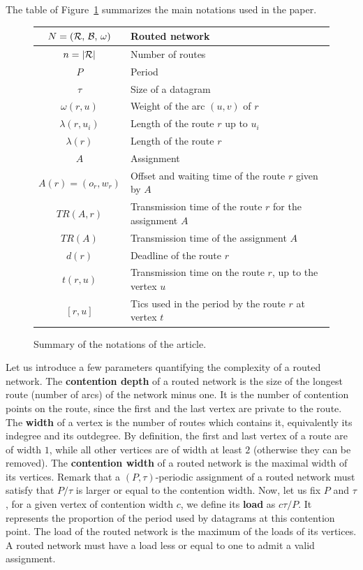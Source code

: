 \documentclass[a4paper,10pt]{journal}
\begin{document}
      The table of Figure~\ref{tab:summary} summarizes the main notations used in the paper.
    \begin{figure}
      \begin{center}
    \begin{tabularx}{\textwidth}{|c|X|}
    \hline
     $N = (\cal{R},\,\cal{B},\,\omega)$ & Routed network \\
     \hline
     $n = |\cal{R}|$ & Number of routes\\
     \hline
     $P$ & Period\\
     \hline
     $\tau$ & Size of a datagram\\
     \hline
     $\omega(r,u)$ & Weight of the arc $(u,v)$ of $r$ \\
     \hline
     $\lambda(r,u_i)$ & Length of the route $r$ up to $u_i$\\
     \hline
     $\lambda(r)$ & Length of the route $r$\\
     \hline 
     $A$ & Assignment\\
     \hline 
     $A(r) = (o_r,w_r)$ & Offset and waiting time of the route $r$ given by $A$ \\
     \hline 
     $TR(A,r)$& Transmission time of the route $r$ for the assignment $A$\\
     \hline 
     $TR(A)$& Transmission time of the assignment $A$\\
     \hline
     $d(r)$ & Deadline of the route $r$\\
     \hline
	 $t(r,u)$ & Transmission time on the route $r$, up to the vertex $u$\\
     \hline
     $ [r,u]$ & Tics used in the period by the route $r$ at vertex $t$\\
     \hline
      \end{tabularx}
      \end{center}
      \caption{Summary of the notations of the article.}\label{tab:summary}
    \end{figure}
  	
  	Let us introduce a few parameters quantifying the complexity of a routed network.
	The \textbf{contention depth} of a routed network is the size of the longest route (number of arcs) of the network minus one. It is the number of contention points on the route, since the first and the last vertex are private to the route. The \textbf{width} of a vertex is the number of routes which contains it, equivalently its indegree and its outdegree. By definition, 
	the first and last vertex of a route are of width $1$, while all other vertices are of width at least $2$
	(otherwise they can be removed).
	The \textbf{contention width} of a routed network is the maximal width of its vertices. 
	Remark that a $(P,\tau)$-periodic assignment of a routed network must satisfy that $P/\tau$ is larger or equal to the contention width. Now, let us fix $P$ and $\tau$, for a given vertex of contention width $c$, we define its \textbf{load} as $c\tau/P$. It represents the proportion of the period used by datagrams at this contention point. The load of the routed network is the maximum of the loads of its vertices. A routed network must have a load less or equal to one to admit a valid assignment.
\end{document}
